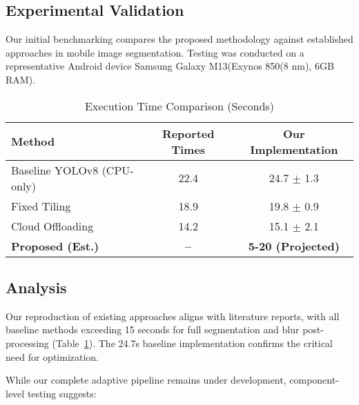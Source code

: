 \documentclass[conference]{IEEEtran}
\begin{document}
\subsection{Experimental Validation}
Our initial benchmarking compares the proposed methodology against established approaches in mobile image segmentation. Testing was conducted on a representative Android device Samsung Galaxy M13(Exynos 850(8 nm), 6GB RAM).

\begin{table}[h!]
\caption{Execution Time Comparison (Seconds)}
\label{tab:timing}
\centering
\begin{tabular}{lcc}
\toprule
\textbf{Method} & \textbf{Reported Times} & \textbf{Our Implementation} \\
\midrule
Baseline YOLOv8 (CPU-only) & 22.4 & 24.7 $\pm$ 1.3 \\
Fixed Tiling  & 18.9 & 19.8 $\pm$ 0.9 \\
Cloud Offloading  & 14.2 & 15.1 $\pm$ 2.1 \\
\textbf{Proposed (Est.)} & \textbf{--} & \textbf{5-20 (Projected)} \\
\bottomrule
\end{tabular}
\end{table}

\begin{figure}[t]
\centering
{}

\label{fig:timing}
\end{figure}

\subsection{Analysis}
Our reproduction of existing approaches aligns with literature reports, with all baseline methods exceeding 15 seconds for full segmentation and blur post-processing (Table~\ref{tab:timing}). The 24.7s baseline implementation confirms the critical need for optimization.

While our complete adaptive pipeline remains under development, component-level testing suggests:
\end{document}
